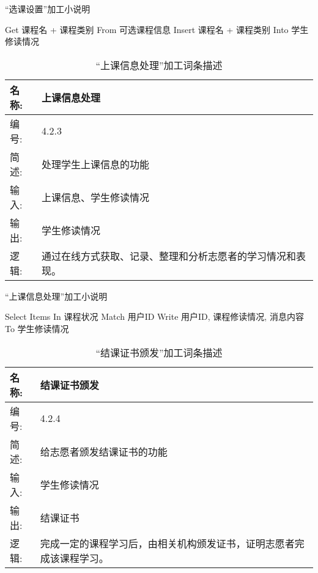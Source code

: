 \begin{algorithm}[H]
    \renewcommand{\thealgorithm}{}
    \caption{“选课设置”加工小说明} 
    \label{alg3} 
    \begin{algorithmic}[1]
        \STATE Get 课程名 + 课程类别 From 可选课程信息
        \STATE Insert 课程名 + 课程类别 Into 学生修读情况
    \end{algorithmic} 
\end{algorithm}



\begin{table}[H]  
\caption{“上课信息处理”加工词条描述}  
\begin{center}  
    \begin{tabular}{l p{11cm}} 
        \hline
        \quad 名称: & 上课信息处理 \\
        \hline
        \quad 编号: & 4.2.3 \\
        \hline
        \quad 简述: & 处理学生上课信息的功能 \\
        \hline
        \quad 输入: & 上课信息、学生修读情况 \\
        \hline
        \quad 输出: & 学生修读情况 \\
        \hline
        \quad 逻辑: & 通过在线方式获取、记录、整理和分析志愿者的学习情况和表现。 \\
        \hline
    \end{tabular}
    \label{tab1}
\end{center}
\end{table}


\begin{algorithm}[H]
    \renewcommand{\thealgorithm}{}
    \caption{“上课信息处理”加工小说明} 
    \label{alg3} 
    \begin{algorithmic}[1]
        \STATE Select Items In 课程状况 Match 用户ID
        \STATE Write 用户ID, 课程修读情况, 消息内容 To 学生修读情况
    \end{algorithmic} 
\end{algorithm}

\begin{table}[H]  
\caption{“结课证书颁发”加工词条描述}  
\begin{center}  
    \begin{tabular}{l p{11cm}} 
        \hline
        \quad 名称: & 结课证书颁发 \\
        \hline
        \quad 编号: & 4.2.4 \\
        \hline
        \quad 简述: & 给志愿者颁发结课证书的功能 \\
        \hline
        \quad 输入: & 学生修读情况 \\
        \hline
        \quad 输出: & 结课证书 \\
        \hline
        \quad 逻辑: & 完成一定的课程学习后，由相关机构颁发证书，证明志愿者完成该课程学习。 \\
        \hline
    \end{tabular}
    \label{tab1}
\end{center}
\end{table}


